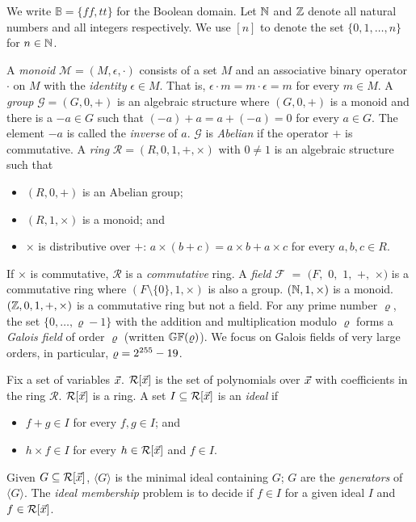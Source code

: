 
We write $\mathbb{B} = \{ \mathit{ff}, \mathit{tt} \}$ for the Boolean
domain. Let $\mathbb{N}$ and $\mathbb{Z}$ denote all natural numbers and all integers
respectively. We use $[n]$ to denote the set $\{ 0, 1, \ldots, n \}$
for $n \in \mathbb{N}$.

A \emph{monoid} $\mathcal{M} = (M, \epsilon, \cdot)$ consists of a set
$M$ and an associative binary operator $\cdot$ on $M$ with the
\emph{identity} $\epsilon \in M$. That is, $\epsilon \cdot m = m \cdot
\epsilon = m$ for every $m \in M$.
A \emph{group} $\mathcal{G} = (G, 0, +)$ is an algebraic structure
where $(G, 0, +)$ is a monoid and there is a $-a \in G$ such that
$(-a) + a = a + (-a) = 0$ for every $a \in G$. The element $-a$ is
called the \emph{inverse} of $a$. $\mathcal{G}$ is \emph{Abelian} if
the operator $+$ is commutative.
A \emph{ring} $\mathcal{R} = (R, 0, 1, +, \times)$ with $0 \neq 1$ is
an algebraic structure such that
\begin{itemize}
\item $(R, 0, +)$ is an Abelian group; 
\item $(R, 1, \times)$ is a monoid; and 
\item $\times$ is distributive over $+$: $a \times (b + c) = a \times
  b + a \times c$ for every $a, b, c \in R$.
\end{itemize}
If $\times$ is commutative, $\mathcal{R}$ is a \emph{commutative}
ring. 
A \emph{field} $\mathcal{F}$ $=$ $(F,$
$0,$ $1,$ $+,$ $\times)$ is a commutative ring where $(F\!\setminus\!\{0\}, 1, \times)$ is also
a group. $(\mathbb{N}, 1, \times)$ is a monoid. $(\mathbb{Z}, 0, 1, +, \times)$ 
is a commutative ring but not a field. 
For any prime number $\varrho$, the set $\{ 0, \ldots, \varrho - 1 \}$
with the addition and multiplication modulo $\varrho$ forms a \emph{Galois
field} of order $\varrho$ (written $\mathbb{GF}(\varrho)$).
We focus on Galois fields of very large orders, in particular, $\varrho =
2^{255} - 19$.

Fix a set of variables $\vec{x}$. $\mathcal{R}[\vec{x}]$ is the set of
polynomials over $\vec{x}$ with coefficients in the ring
$\mathcal{R}$. $\mathcal{R}[\vec{x}]$ is a ring. A set $I \subseteq
\mathcal{R}[\vec{x}]$ is an \emph{ideal} if 
\begin{itemize}
\item $f + g \in I$ for every $f, g \in I$; and
\item $h \times f \in I$ for every $h \in
  \mathcal{R}[\vec{x}]$ and $f \in I$. 
\end{itemize}
Given $G \subseteq \mathcal{R}[\vec{x}]$, $\langle G \rangle$ is the
minimal ideal containing $G$; $G$ are the \emph{generators}
of $\langle G \rangle$. The \emph{ideal membership}
problem is to decide if $f \in I$ for a given ideal $I$ and $f
\in \mathcal{R}[\vec{x}]$.

